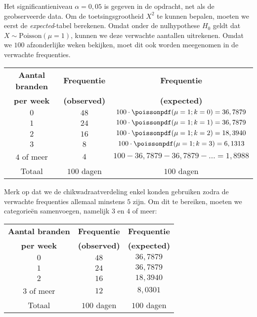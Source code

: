 {    Het significantieniveau $\alpha=0,05$ is gegeven in de opdracht, net als de geobserveerde data.
    Om de toetsingsgrootheid $X^2$ te kunnen bepalen, moeten we eerst de \emph{expected}-tabel berekenen.
    Omdat onder de nulhypothese $H_0$ geldt dat $X \sim \text{Poisson}(\mu=1)$, kunnen we deze verwachte aantallen uitrekenen. 
    Omdat we $100$ afzonderlijke weken bekijken, moet dit ook worden meegenomen in de verwachte frequenties.   
    \begin{center}
        \renewcommand{\arraystretch}{1.25}
        \begin{tabular}{ccc}
            \toprule
                {\bfseries Aantal branden} & {\bfseries Frequentie} & {\bfseries Frequentie} \\
                {\bfseries per week} & {\bfseries (observed)} & {\bfseries (expected)} \\
            \cmidrule{1-1} \cmidrule{2-2} \cmidrule{3-3}
                $0$         & $48$ & $100 \cdot \poissonpdf(\mu=1; k=0) = 36,7879$ \\
                $1$         & $24$ & $100 \cdot \poissonpdf(\mu=1; k=1) = 36,7879$ \\
                $2$         & $16$ & $100 \cdot \poissonpdf(\mu=1; k=2) = 18,3940$ \\
                $3$         &  $8$ & $100 \cdot \poissonpdf(\mu=1; k=3) = 6,1313$ \\
                $4$ of meer &  $4$ & $100 - 36,7879 - 36,7879 - \ldots = 1,8988$ \\
            \cmidrule{1-1} \cmidrule{2-2} \cmidrule{3-3}
                Totaal & $100$ dagen & $100$ dagen \\
            \bottomrule
        \end{tabular}
    \end{center}
    Merk op dat we de chikwadraatverdeling enkel konden gebruiken zodra de verwachte frequenties allemaal minstens $5$ zijn.
    Om dit te bereiken, moeten we categorie\"en samenvoegen, namelijk $3$ en $4$ of meer:
    \begin{center}
        \renewcommand{\arraystretch}{1.25}
        \begin{tabular}{ccc}
            \toprule
                {\bfseries Aantal branden} & {\bfseries Frequentie} & {\bfseries Frequentie} \\
                {\bfseries per week} & {\bfseries (observed)} & {\bfseries (expected)} \\
            \cmidrule{1-1} \cmidrule{2-2} \cmidrule{3-3}
                $0$         & $48$ & $36,7879$ \\
                $1$         & $24$ & $36,7879$ \\
                $2$         & $16$ & $18,3940$ \\
                $3$ of meer & $12$ & $8,0301$ \\
            \cmidrule{1-1} \cmidrule{2-2} \cmidrule{3-3}
                Totaal & $100$ dagen & $100$ dagen \\
            \bottomrule
        \end{tabular}
    \end{center}

}
